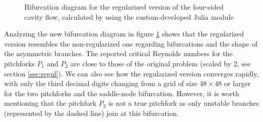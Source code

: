 \begin{figure}[!htb]
  \caption{Bifurcation diagram for the regularized version of the four-sided
    cavity flow, calculated by using the custom-developed Julia module} 
  \label{fig:bif_diag}
\end{figure}

Analyzing the new bifurcation diagram in figure \ref{fig:bif_diag} shows that
the regularized version resembles the non-regularized one regarding
bifurcations and the shape of the asymmetric branches. The reported critical
Reynolds numbers for the pitchforks $P_1$ and $P_2$ are close to those of the
original problem (scaled by $2$, see section \ref{sec:regul}). We can also see
how the regularized version converges rapidly, with only the third decimal
digits changing from a grid of size $48 \times 48$ or larger for the two
pitchforks and the saddle-node bifurcation. However, it is worth mentioning
that the pitchfork $P_2$ is not a true pitchfork as only unstable branches
(represented by the dashed line) join at this bifurcation.


